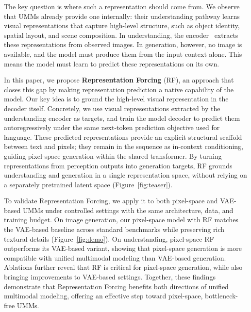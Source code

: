 The key question is where such a representation should come from. We observe that UMMs already provide one internally: their understanding pathway learns visual representations that capture high-level structure, such as object identity, spatial layout, and scene composition. In understanding, the encoder~\cite{siglip,tschannen2025siglip2,dinov2,dinov3} extracts these representations from observed images. In generation, however, no image is available, and the model must produce them from the input context alone. This means the model must learn to predict these representations on its own.


In this paper, we propose \textbf{Representation Forcing} (RF), an approach that closes this gap by making representation prediction a native capability of the model. Our key idea is to ground the high-level visual representation in the decoder itself. Concretely, we use visual representations extracted by the understanding encoder as targets, and train the model decoder to predict them autoregressively under the same next-token prediction objective used for language. These predicted representations provide an explicit structural scaffold between text and pixels; they remain in the sequence as in-context conditioning, guiding pixel-space generation within the shared transformer. By turning representations from perception outputs into generation targets, RF grounds understanding and generation in a single representation space, without relying on a separately pretrained latent space (Figure~\ref{fig:teaser}).



To validate Representation Forcing, we apply it to both pixel-space and VAE-based UMMs under controlled settings with the same architecture, data, and training budget. On image generation, our pixel-space model with RF matches the VAE-based baseline across standard benchmarks while preserving rich textural details (Figure~\ref{fig:demo}). On understanding, pixel-space RF outperforms its VAE-based variant, showing that pixel-space generation is more compatible with unified multimodal modeling than VAE-based generation. Ablations further reveal that RF is critical for pixel-space generation, while also bringing improvements to VAE-based settings. Together, these findings demonstrate that Representation Forcing benefits both directions of unified multimodal modeling, offering an effective step toward pixel-space, bottleneck-free UMMs.


